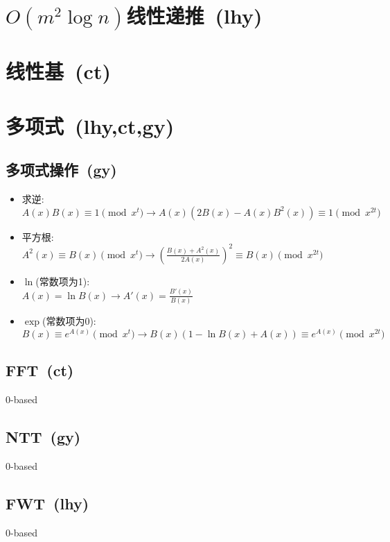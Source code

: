 \section{$ O(m ^ 2 \log n) $线性递推\ \small(lhy)}
\section{线性基\ \small(ct)}
\section{多项式\ \small(lhy,ct,gy)}
    \subsection*{多项式操作\ \small(gy)}
        \begin{itemize}[wide=0pt]
            \item 求逆:
            \\$ A(x) B(x) \equiv 1 \pmod{x^t} \to A(x) (2B(x) - A(x) B^2(x)) \equiv 1 \pmod{x^{2t}} $
            \item 平方根:
            \\$ A^2(x) \equiv B(x) \pmod{x^t} \to (\frac{B(x) + A^2(x)}{2A(x)})^2 \equiv B(x) \pmod{x^{2t}} $
            \item $ \ln $(常数项为1):
            \\$ A(x) = \ln B(x) \to A'(x) = \frac{B'(x)}{B(x)} $
            \item $ \exp $(常数项为0):
            \\$ B(x) \equiv e^{A(x)} \pmod{x^t} \to B(x) (1 - \ln B(x) + A(x)) \equiv e^{A(x)} \pmod{x^{2t}} $
        \end{itemize}
	\subsection*{FFT\ \small(ct)}
		$ 0 $-based
	\subsection*{NTT\ \small(gy)}
		$ 0 $-based
	\subsection*{FWT\ \small(lhy)}
		$ 0 $-based
